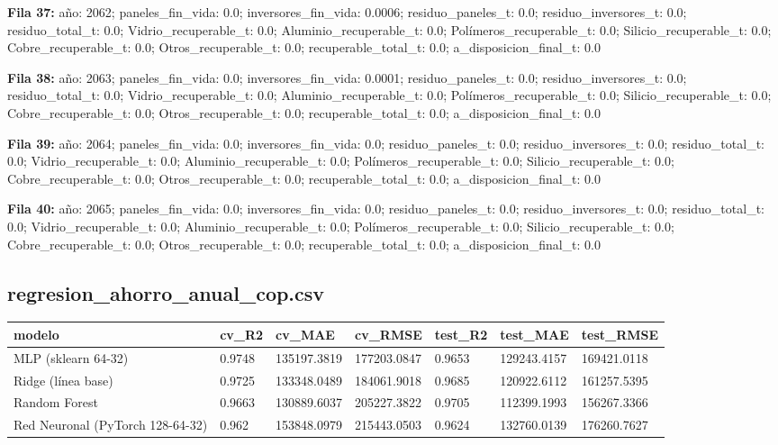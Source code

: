 {\footnotesize\textbf{Fila 37:} año: 2062; paneles\_fin\_vida: 0.0; inversores\_fin\_vida: 0.0006; residuo\_paneles\_t: 0.0; residuo\_inversores\_t: 0.0; residuo\_total\_t: 0.0; Vidrio\_recuperable\_t: 0.0; Aluminio\_recuperable\_t: 0.0; Polímeros\_recuperable\_t: 0.0; Silicio\_recuperable\_t: 0.0; Cobre\_recuperable\_t: 0.0; Otros\_recuperable\_t: 0.0; recuperable\_total\_t: 0.0; a\_disposicion\_final\_t: 0.0\par}
{\footnotesize\textbf{Fila 38:} año: 2063; paneles\_fin\_vida: 0.0; inversores\_fin\_vida: 0.0001; residuo\_paneles\_t: 0.0; residuo\_inversores\_t: 0.0; residuo\_total\_t: 0.0; Vidrio\_recuperable\_t: 0.0; Aluminio\_recuperable\_t: 0.0; Polímeros\_recuperable\_t: 0.0; Silicio\_recuperable\_t: 0.0; Cobre\_recuperable\_t: 0.0; Otros\_recuperable\_t: 0.0; recuperable\_total\_t: 0.0; a\_disposicion\_final\_t: 0.0\par}
{\footnotesize\textbf{Fila 39:} año: 2064; paneles\_fin\_vida: 0.0; inversores\_fin\_vida: 0.0; residuo\_paneles\_t: 0.0; residuo\_inversores\_t: 0.0; residuo\_total\_t: 0.0; Vidrio\_recuperable\_t: 0.0; Aluminio\_recuperable\_t: 0.0; Polímeros\_recuperable\_t: 0.0; Silicio\_recuperable\_t: 0.0; Cobre\_recuperable\_t: 0.0; Otros\_recuperable\_t: 0.0; recuperable\_total\_t: 0.0; a\_disposicion\_final\_t: 0.0\par}
{\footnotesize\textbf{Fila 40:} año: 2065; paneles\_fin\_vida: 0.0; inversores\_fin\_vida: 0.0; residuo\_paneles\_t: 0.0; residuo\_inversores\_t: 0.0; residuo\_total\_t: 0.0; Vidrio\_recuperable\_t: 0.0; Aluminio\_recuperable\_t: 0.0; Polímeros\_recuperable\_t: 0.0; Silicio\_recuperable\_t: 0.0; Cobre\_recuperable\_t: 0.0; Otros\_recuperable\_t: 0.0; recuperable\_total\_t: 0.0; a\_disposicion\_final\_t: 0.0\par}
\subsection*{regresion\_ahorro\_anual\_cop.csv}
{\footnotesize\begin{longtable}{@{}p{}llllll@{}}
\toprule
modelo & cv\_R2 & cv\_MAE & cv\_RMSE & test\_R2 & test\_MAE & test\_RMSE \\
\midrule\endhead
MLP (sklearn 64-32) & 0.9748 & 135197.3819 & 177203.0847 & 0.9653 & 129243.4157 & 169421.0118 \\
Ridge (línea base) & 0.9725 & 133348.0489 & 184061.9018 & 0.9685 & 120922.6112 & 161257.5395 \\
Random Forest & 0.9663 & 130889.6037 & 205227.3822 & 0.9705 & 112399.1993 & 156267.3366 \\
Red Neuronal (PyTorch 128-64-32) & 0.962 & 153848.0979 & 215443.0503 & 0.9624 & 132760.0139 & 176260.7627 \\
\bottomrule
\end{longtable}}

